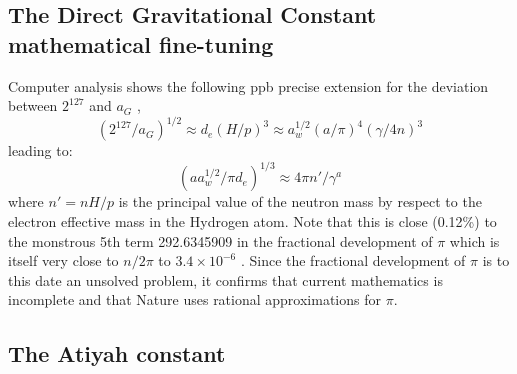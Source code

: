 \documentclass[twoside,draft]{article}
\begin{document}
{\subsection {The Direct Gravitational Constant mathematical fine-tuning}

Computer analysis shows the following ppb precise extension for the deviation between $2^{127}$ and
$a_{G}$ ,
\begin{equation}
(2^{127} / a_{G})^{1/2} \approx d_{e} (H/p)^{3} \approx a_{w}^{1/2} (a/\pi)^{4} ( \gamma/4n)^{3}
\end{equation}
leading to:
\begin{equation}
(aa_{w}^{1/2} /\pi d_{e})^{1/3} \approx 4\pi n\prime/ \gamma^{a}
\end{equation}
where $n\prime = nH/p$ is the principal value of the neutron mass by respect to the electron effective mass
in the Hydrogen atom. Note that this is close (0.12\%) to the monstrous 5th term 292.6345909 in
the fractional development of $\pi$ which is itself very close to $n/2\pi$ to $3.4 \times 10^{-6}$ . Since the fractional
development of $\pi$ is to this date an unsolved problem, it confirms that current mathematics is
incomplete and that Nature uses rational approximations for $\pi$.

\subsection {The Atiyah constant}

}
\end{document}
